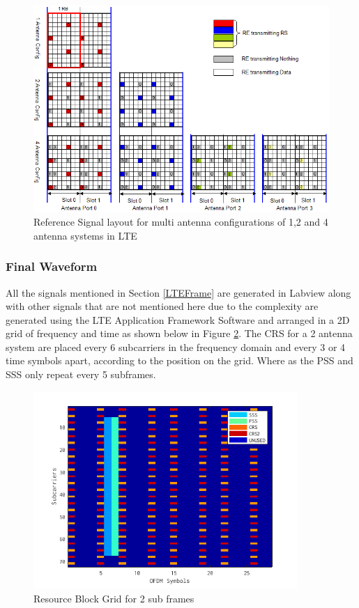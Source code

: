 \begin{figure}[H]
    \begin{center}
        \includegraphics[width=\linewidth]{images/CRSMultiAntenna.png}
        \caption{Reference Signal layout for multi antenna configurations of 1,2 and 4 antenna systems in LTE}
        \label{fig:CRSMultiAntenna}
    \end{center}
\end{figure}


\subsubsection{Final Waveform}
All the signals mentioned in Section \ref{LTEFrame} are generated in Labview along with other signals that are not mentioned here due to the complexity are generated using the LTE Application Framework Software and arranged in a 2D grid of frequency and time as shown below in Figure \ref{fig:RBSignals}. The CRS for a 2 antenna system are placed every 6 subcarriers in the frequency domain and every 3 or 4 time symbols apart, according to the position on the grid. Where as the PSS and SSS only repeat every 5 subframes.

\begin{figure}[H]
    \begin{center}
        \includegraphics[width=10cm]{images/FrameLegend.png}
        \caption{Resource Block Grid for 2 sub frames}
        \label{fig:RBSignals}
    \end{center}
\end{figure}


